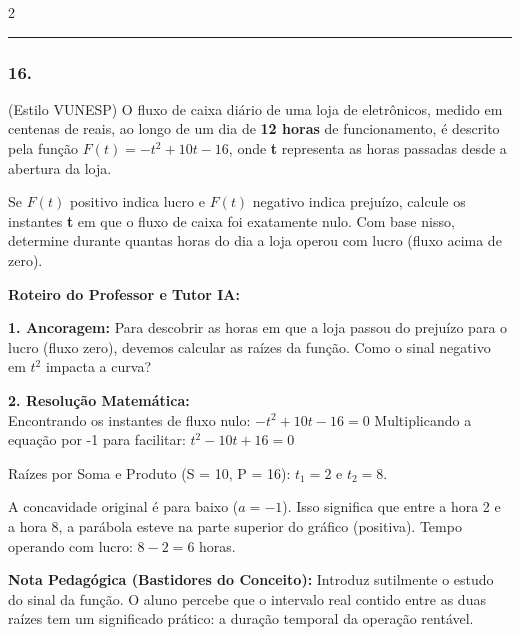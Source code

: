 \begin{multicols*}{2}
\noindent\textcolor{CorLinha}{\rule{\linewidth}{0.5pt}} 
\par\vspace{\espacoPreQuestao}
\subsubsection*{16.} 
\begin{enunciadoLiteral}
(Estilo VUNESP) O fluxo de caixa diário de uma loja de eletrônicos, medido em centenas de reais, ao longo de um dia de \textbf{12 horas} de funcionamento, é descrito pela função $F(t) = -t^2 + 10t - 16$, onde \textbf{t} representa as horas passadas desde a abertura da loja.

Se $F(t)$ positivo indica lucro e $F(t)$ negativo indica prejuízo, calcule os instantes \textbf{t} em que o fluxo de caixa foi exatamente nulo. Com base nisso, determine durante quantas horas do dia a loja operou com lucro (fluxo acima de zero).
\end{enunciadoLiteral}

\ifgabarito
    \begin{tcolorbox}[colback=CorTitUm!5, colframe=CorTitUm, boxrule=1pt, arc=4pt, left=6pt, right=6pt, top=6pt, bottom=6pt]
    \small\textbf{\textcolor{CorTitUm}{Roteiro do Professor e Tutor IA:}}\par\vspace{0.1cm}
    \color{CinzaEscuro}
    \textbf{1. Ancoragem:} Para descobrir as horas em que a loja passou do prejuízo para o lucro (fluxo zero), devemos calcular as raízes da função. Como o sinal negativo em $t^2$ impacta a curva?\par\vspace{0.1cm}
    \textbf{2. Resolução Matemática:}\\
    Encontrando os instantes de fluxo nulo:
    $-t^2 + 10t - 16 = 0$
    Multiplicando a equação por -1 para facilitar:
    $t^2 - 10t + 16 = 0$
    
    Raízes por Soma e Produto (S = 10, P = 16):
    $t_1 = 2$ e $t_2 = 8$.
    
    A concavidade original é para baixo ($a = -1$). Isso significa que entre a hora 2 e a hora 8, a parábola esteve na parte superior do gráfico (positiva).
    Tempo operando com lucro: $8 - 2 = 6$ horas.
    \end{tcolorbox}
    \vspace{0.15cm}
    
    \begin{boxexplicacao}
    \textbf{Nota Pedagógica (Bastidores do Conceito):} Introduz sutilmente o estudo do sinal da função. O aluno percebe que o intervalo real contido entre as duas raízes tem um significado prático: a duração temporal da operação rentável.
    \end{boxexplicacao}
\fi


\end{multicols*}
